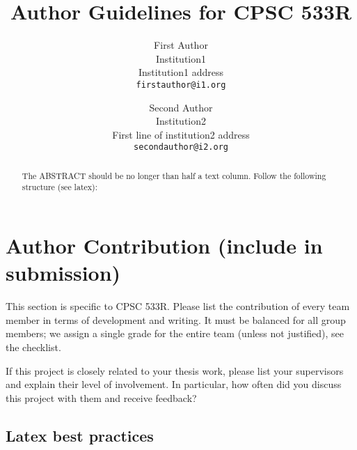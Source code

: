 \documentclass[10pt,twocolumn,letterpaper]{article}
\begin{document}
	

\title{Author Guidelines for CPSC 533R}

\author{First Author\\
Institution1\\
Institution1 address\\
{\tt\small firstauthor@i1.org}
\and
Second Author\\
Institution2\\
First line of institution2 address\\
{\tt\small secondauthor@i2.org}
}

\maketitle

\begin{abstract}
   The ABSTRACT should be no longer than half a text column. Follow the following structure (see latex):
\end{abstract}

\section{Author Contribution (include in submission)}
This section is specific to CPSC 533R. Please list the contribution of every team member in terms of development and writing.
It must be balanced for all group members; we assign a single grade for the entire team (unless not justified), see the checklist. 

If this project is closely related to your thesis work, please list your supervisors and explain their level of involvement. In particular, how often did you discuss this project with them and receive feedback?

\subsection{Latex best practices}
\end{document}
